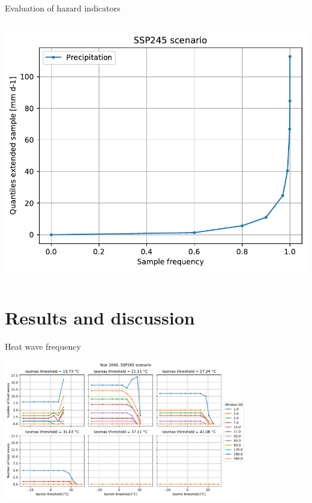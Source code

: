 \documentclass[aspectratio=169]{beamer}
\begin{document}
\begin{frame}{Evaluation of hazard indicators}
\begin{columns}[c]
\begin{column}{0.40\textwidth}
{\begin{center}
    \includegraphics[width=0.47\textheight]{precipitation_quantile_ssp245_sample}
  \end{center}
  }
\end{column}
\end{columns}
\end{frame}






\section{Results and discussion}
\begin{frame}{Heat wave frequency}
  \begin{center}
    \includegraphics[width=0.8\textwidth]{heat_wave_frequency_ssp245}
\end{center}
\end{frame}
\end{document}
